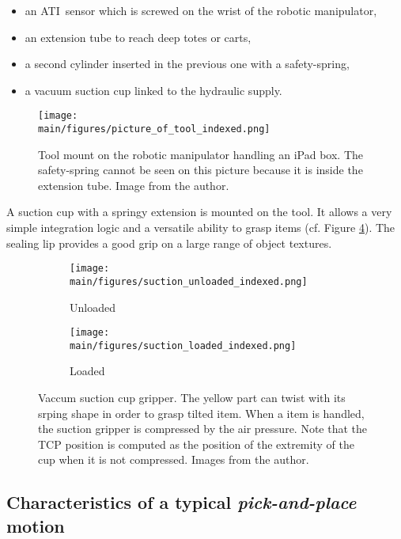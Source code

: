 \documentclass[/home/francois/latex/report/main.tex]{subfiles}
\begin{document}
\begin{itemize}
  \item an ATI\texttrademark \ sensor which is screwed on the wrist of the robotic manipulator,
  \item an extension tube to reach deep totes or carts,
  \item a second cylinder inserted in the previous one with a safety-spring,
  \item a vacuum suction cup linked to the hydraulic supply.
\end{itemize}

\begin{figure}
  \centering
  \texttt{[image: \\main/figures/picture\_of\_tool\_indexed.png]}
  \caption{Tool mount on the robotic manipulator handling an iPad box. The safety-spring cannot be seen on this picture because it is inside the extension tube. Image from the author.}
  \label{fig:background:tool}
\end{figure}

A suction cup with a springy extension is mounted on the tool. It allows a very simple integration logic and a versatile ability to grasp items (cf. Figure \ref{fig:background:suction}). The sealing lip provides a good grip on a large range of object textures.

\begin{figure}
\centering
\begin{subfigure}{0.49\textwidth}
\centering
\texttt{[image: \\main/figures/suction\_unloaded\_indexed.png]}
\caption{Unloaded}
\label{fig:background:suction-unloaded}
\end{subfigure}
\begin{subfigure}{0.49\textwidth}
\centering
\texttt{[image: \\main/figures/suction\_loaded\_indexed.png]}
\caption{Loaded}
\label{fig:background:suction-loaded}
\end{subfigure}
\caption{Vaccum suction cup gripper. The yellow part can twist with its srping shape in order to grasp tilted item. When a item is handled, the suction gripper is compressed by the air pressure. Note that the \ac{TCP} position is computed as the position of the extremity of the cup when it is not compressed. Images from the author.}
\label{fig:background:suction}
\end{figure}

\subsection{Characteristics of a typical \textit{pick-and-place} motion}
\label{background:motion}
\end{document}
